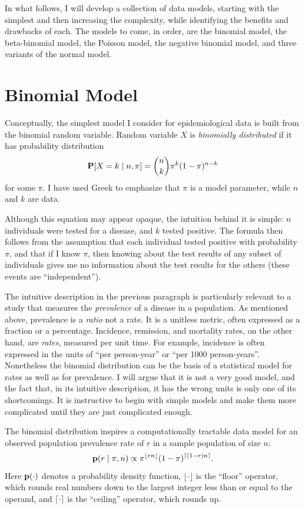 In what follows, I will develop a collection of data models, starting
with the simplest and then increasing the complexity, while
identifying the benefits and drawbacks of each.  The models to come,
in order, are the binomial model, the beta-binomial model, the Poisson
model, the negative binomial model, and three variants of the normal
model.

\section{Binomial Model}
Conceptually, the simplest model I consider for epidemiological data
is built from the binomial random variable. Random variable $X$ is
\emph{binomially distributed} if it has probability distribution
\[
\mathbf{P}[X=k\;|\; n, \pi] = \binom{n}{k}\pi^k(1-\pi)^{n-k}
\]
for some $\pi$.  I have used Greek to emphasize that $\pi$ is a model
parameter, while $n$ and $k$ are data.

Although this equation may appear opaque, the intuition behind it is
simple: $n$ individuals were tested for a disease, and $k$ tested
positive. The formula then follows from the assumption that each
individual tested positive with probability $\pi$, and that if I know
$\pi$, then knowing about the test results of any subset of
individuals gives me no information about the test results for the
others (these events are ``independent'').

The intuitive description in the previous paragraph is particularly
relevant to a study that measures the \emph{prevalence} of a disease
in a population.  As mentioned above, prevalence is a \emph{ratio} not
a rate.  It is a unitless metric, often expressed as a fraction or a
percentage.  Incidence, remission, and mortality rates, on the other
hand, are \emph{rates}, measured per unit time.  For example,
incidence is often expressed in the units of ``per person-year'' or
``per 1000 person-years''.  Nonetheless the binomial distribution can
be the basis of a statistical model for rates as well as for
prevalence.  I will argue that it is not a very good model, and the
fact that, in its intuitive description, it has the wrong units is
only one of its shortcomings.  It is instructive to
begin with simple models and make them more complicated until they
are just complicated enough.

The binomial distribution inspires a computationally tractable
data model for an observed population prevalence rate of
$r$ in a sample population of size $n$:
\[
\mathbf{p}(r\;|\; \pi, n) \propto \pi^{\lfloor rn \rfloor}(1-\pi)^{\lceil (1-r)n \rceil}.
\]
Here $\mathbf{p}(\cdot)$ denotes a probability density function, $\lfloor
\cdot \rfloor$ is the ``floor'' operator, which rounds real numbers
down to the largest integer less than or equal to the operand, and
$\lceil \cdot \rceil$ is the ``ceiling'' operator, which rounds up.

